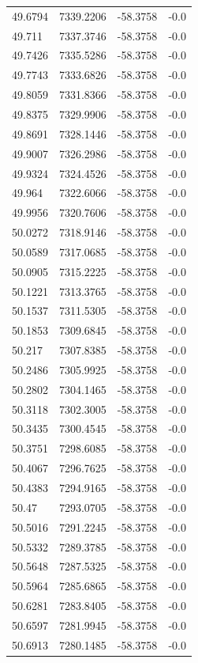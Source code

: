 \begin{table}[H]
\begin{tabular}{llll}
49.6794 & 7339.2206 & -58.3758 & -0.0 \\
49.711 & 7337.3746 & -58.3758 & -0.0 \\
49.7426 & 7335.5286 & -58.3758 & -0.0 \\
49.7743 & 7333.6826 & -58.3758 & -0.0 \\
49.8059 & 7331.8366 & -58.3758 & -0.0 \\
49.8375 & 7329.9906 & -58.3758 & -0.0 \\
49.8691 & 7328.1446 & -58.3758 & -0.0 \\
49.9007 & 7326.2986 & -58.3758 & -0.0 \\
49.9324 & 7324.4526 & -58.3758 & -0.0 \\
49.964 & 7322.6066 & -58.3758 & -0.0 \\
49.9956 & 7320.7606 & -58.3758 & -0.0 \\
50.0272 & 7318.9146 & -58.3758 & -0.0 \\
50.0589 & 7317.0685 & -58.3758 & -0.0 \\
50.0905 & 7315.2225 & -58.3758 & -0.0 \\
50.1221 & 7313.3765 & -58.3758 & -0.0 \\
50.1537 & 7311.5305 & -58.3758 & -0.0 \\
50.1853 & 7309.6845 & -58.3758 & -0.0 \\
50.217 & 7307.8385 & -58.3758 & -0.0 \\
50.2486 & 7305.9925 & -58.3758 & -0.0 \\
50.2802 & 7304.1465 & -58.3758 & -0.0 \\
50.3118 & 7302.3005 & -58.3758 & -0.0 \\
50.3435 & 7300.4545 & -58.3758 & -0.0 \\
50.3751 & 7298.6085 & -58.3758 & -0.0 \\
50.4067 & 7296.7625 & -58.3758 & -0.0 \\
50.4383 & 7294.9165 & -58.3758 & -0.0 \\
50.47 & 7293.0705 & -58.3758 & -0.0 \\
50.5016 & 7291.2245 & -58.3758 & -0.0 \\
50.5332 & 7289.3785 & -58.3758 & -0.0 \\
50.5648 & 7287.5325 & -58.3758 & -0.0 \\
50.5964 & 7285.6865 & -58.3758 & -0.0 \\
50.6281 & 7283.8405 & -58.3758 & -0.0 \\
50.6597 & 7281.9945 & -58.3758 & -0.0 \\
50.6913 & 7280.1485 & -58.3758 & -0.0 \\

\end{tabular}
\end{table}
